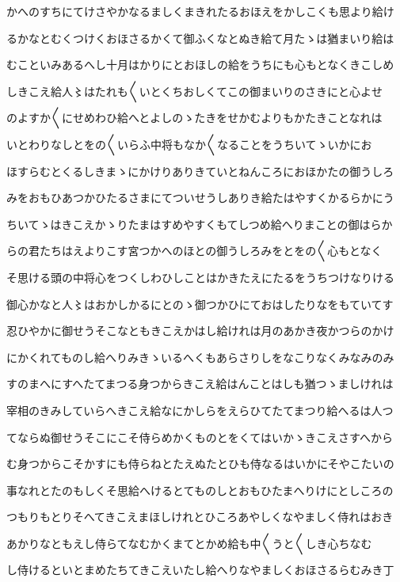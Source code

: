 \documentclass[a4paper,11pt,landscape]{ltjtarticle}
\begin{document}
かへのすちにてけさやかなるましくまきれたるおほえをかしこくも思より給け
\par\medskip
るかなとむくつけくおほさるかくて御ふくなとぬき給て月たゝは猶まいり給は
\par\medskip
むこといみあるへし十月はかりにとおほしの給をうちにも心もとなくきこしめ
\par\medskip
しきこえ給人〻はたれも〱いとくちおしくてこの御まいりのさきにと心よせ
\par\medskip
のよすか〱にせめわひ給へとよしのゝたきをせかむよりもかたきことなれは
\par\medskip
いとわりなしとをの〱いらふ中将もなか〱なることをうちいてゝいかにお
\par\medskip
ほすらむとくるしきまゝにかけりありきていとねんころにおほかたの御うしろ
\par\medskip
みをおもひあつかひたるさまにてついせうしありき給たはやすくかるらかにう
\par\medskip
ちいてゝはきこえかゝりたまはすめやすくもてしつめ給へりまことの御はらか
\par\medskip
らの君たちはえよりこす宮つかへのほとの御うしろみをとをの〱心もとなく
\par\medskip
そ思ける頭の中将心をつくしわひしことはかきたえにたるをうちつけなりける
\par\medskip
御心かなと人〻はおかしかるにとのゝ御つかひにておはしたりなをもていてす
\par\medskip
忍ひやかに御せうそこなともきこえかはし給けれは月のあかき夜かつらのかけ
\par\medskip
にかくれてものし給へりみきゝいるへくもあらさりしをなこりなくみなみのみ
\par\medskip
すのまへにすへたてまつる身つからきこえ給はんことはしも猶つゝましけれは
\par\medskip
宰相のきみしていらへきこえ給なにかしらをえらひてたてまつり給へるは人つ
\par\medskip
てならぬ御せうそこにこそ侍らめかくものとをくてはいかゝきこえさすへから
\par\medskip
む身つからこそかすにも侍らねとたえぬたとひも侍なるはいかにそやこたいの
\par\medskip
事なれとたのもしくそ思給へけるとてものしとおもひたまへりけにとしころの
\par\medskip
つもりもとりそへてきこえまほしけれとひころあやしくなやましく侍れはおき
\par\medskip
あかりなともえし侍らてなむかくまてとかめ給も中〱うと〱しき心ちなむ
\par\medskip
し侍けるといとまめたちてきこえいたし給へりなやましくおほさるらむみき丁
\end{document}
